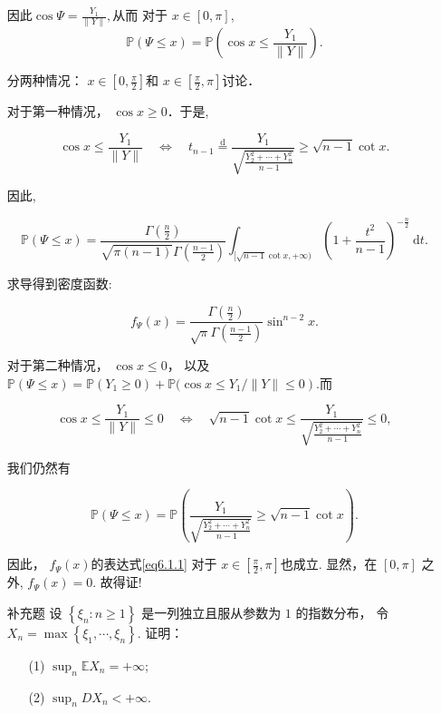 \begin{itemize}
因此$\cos \Psi=\frac{Y_{1}}{\|Y\|},$从而
对于  $x \in[0, \pi]$,
$$\mathbb{P}(\Psi \leq x)=\mathbb{P}\left(\cos x \leq \frac{Y_{1}}{\|Y\|}\right).$$

分两种情况： $x \in[0, \frac{\pi}{2}] $和  $x \in[\frac{\pi}{2}, \pi]$讨论．

对于第一种情况，  $\cos x \geq  0$．于是,

$$\cos x \leq \frac{Y_{1}}{\|Y\|} \quad \Leftrightarrow \quad t_{n-1} \stackrel{\mathrm{d}}{=} \frac{Y_1}{\sqrt{\frac{Y_{2}^{2}+\cdots+Y_{n}^{2}}{n-1}}} \geq \sqrt{n-1} \cot x.$$

因此,

$$\mathbb{P}(\Psi \leq x)=\frac{\Gamma\left(\frac{n}{2}\right)}{\sqrt{\pi(n-1)} \Gamma\left(\frac{n-1}{2}\right)} \int_{[\sqrt{n-1} \cot x,+\infty)}\left(1+\frac{t^{2}}{n-1}\right)^{-\frac{n}{2}} \mathrm{~d} t.$$

求导得到密度函数:

\begin{equation}
f_{\Psi}(x)=\frac{\Gamma\left(\frac{n}{2}\right)}{\sqrt{\pi} \Gamma\left(\frac{n-1}{2}\right)} \sin ^{n-2} x.
\label{eq6.1.1}
  
\end{equation}

对于第二种情况，  $\cos x \leq 0$，
以及  $\mathbb{P}(\Psi \leq x)=\mathbb{P}\left(Y_{1} \geq 0\right)+\mathbb{P}(\cos x \leq   \left.Y_{1} /\|Y\| \leq 0\right)$.而

$$\cos x \leq \frac{Y_{1}}{\|Y\|} \leq 0 \quad \iff \quad \sqrt{n-1} \cot x \leq \frac{Y_{1}}{\sqrt{\frac{Y_{2}^{2}+\cdots+Y_{n}^{2}}{n-1}}} \leq 0,$$

我们仍然有

$$\mathbb{P}(\Psi \leq x)=\mathbb{P}\left(\frac{Y_{1}}{\sqrt{\frac{Y_{2}^{2}+\cdots+Y_{n}^{2}}{n-1}}} \geq \sqrt{n-1} \cot x\right).$$

因此， $f_{\Psi}(x)$的表达式\eqref{eq6.1.1}
对于  $x \in [\frac{\pi}{2}, \pi]  $也成立.
显然，在  $[0, \pi]$   之外, $ f_{\Psi} (x) = 0$. 故得证!

\item[补充题]
设  $\left\{\xi_{n}: n \geq 1\right\}$
是一列独立且服从参数为 $1$ 的指数分布，
令  $X_{n}=   \max \left\{\xi_{1}, \cdots, \xi_{n}\right\}$. 
证明：
\begin{itemize}
    \item[(1)]$\sup _{n} \mathbb{E} X_{n}=+\infty$;

    \item[(2)]$\sup _{n} D X_{n}<+\infty$.
\end{itemize} 


\end{itemize}
